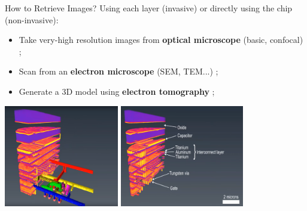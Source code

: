 \documentclass[aspectratio=169]{beamer}
\begin{document}
	\begin{frame}{How to Retrieve Images?}
		Using each layer (invasive) or directly using the chip (non-invasive):
		\begin{itemize}
			\item Take very-high resolution images from \textbf{optical microscope} (basic, confocal) ;
			\item Scan from an \textbf{electron microscope} (SEM, TEM...) ;
			\item Generate a 3D model using \textbf{electron tomography} ;
		\end{itemize}
		
		\begin{center}
			\includegraphics[width=5cm]{res/3d_1.png}
			\includegraphics[width=5.4cm]{res/3d_2.png}
			\cite{Holler2017}
		\end{center}
	\end{frame}
	
\end{document}
